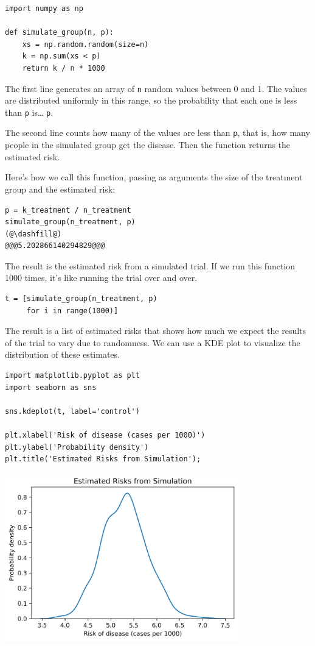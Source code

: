\begin{lstlisting}[]
import numpy as np

def simulate_group(n, p):
    xs = np.random.random(size=n)
    k = np.sum(xs < p)
    return k / n * 1000
\end{lstlisting}

The first line generates an array of \passthrough{\lstinline!n!} random
values between 0 and 1. The values are distributed uniformly in this
range, so the probability that each one is less than
\passthrough{\lstinline!p!} is\ldots{} \passthrough{\lstinline!p!}.

The second line counts how many of the values are less than
\passthrough{\lstinline!p!}, that is, how many people in the simulated
group get the disease. Then the function returns the estimated risk.

Here's how we call this function, passing as arguments the size of the
treatment group and the estimated risk:

\begin{lstlisting}[]
p = k_treatment / n_treatment
simulate_group(n_treatment, p)
(@\dashfill@)
@@@5.202866140294829@@@
\end{lstlisting}

The result is the estimated risk from a simulated trial. If we run this
function 1000 times, it's like running the trial over and over.

\begin{lstlisting}[]
t = [simulate_group(n_treatment, p)
     for i in range(1000)]
\end{lstlisting}

The result is a list of estimated risks that shows how much we expect
the results of the trial to vary due to randomness. We can use a KDE
plot to visualize the distribution of these estimates.

\begin{lstlisting}[]
import matplotlib.pyplot as plt
import seaborn as sns

sns.kdeplot(t, label='control')

plt.xlabel('Risk of disease (cases per 1000)')
plt.ylabel('Probability density')
plt.title('Estimated Risks from Simulation');
\end{lstlisting}

\begin{center}
\includegraphics[width=4in]{11_resampling_files/11_resampling_30_0.png}
\end{center}

